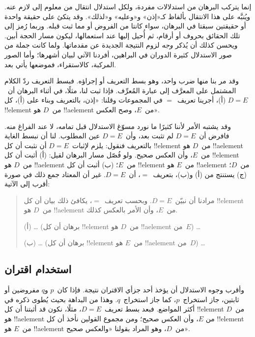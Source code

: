 \documentclass[../../../include/open-logic-section]{subfiles}
\begin{document}


إنما يتركب البرهان من استدلالات مفردة، ولكل استدلال انتقال من معلوم
إلى لازم عنه. ويُنبَّه على هذا الانتقال بألفاظ كـ«إذن» و«وعليه»
و«لذلك». وقد يتكئ على حقيقة واحدة أو حقيقتين سبقتا في البرهان، سواء
كانتا من الفروض أو مما ثبت قبله. وربما رُمز إلى تلك الحقائق بحروف أو
أرقام، ثم أُحيل إليها عند استعمالها، ليكون مسار الحجة أبين. ويحسن
كذلك أن يُذكر \emph{وجه} لزوم النتيجة الجديدة عن مقدماتها. ولما كانت
جملة من صور الاستدلال كثيرة الدوران في البراهين، أفردنا الآتي لبيان
أشهرها؛ وأما الصور المركبة، كالاستقراء، فموضعها يأتي بعد.

وقد مر بنا منها ضرب واحد، وهو بسط التعريف أو إجراؤه. فبسط التعريف ردّ
الكلام المشتمل على المعرَّف إلى عبارة المُعرِّف. فإذا ثبت لنا، مثلًا،
في أثناء البرهان أن~$D = E$ (أ)، أجرينا تعريف~$=$ في المجموعات وقلنا:
«إذن، بالتعريف وبناء على (أ)، كل !!{element} من~$D$ هو !!a{element}
من~$E$، وصح العكس».

وقد يشتبه الأمر لأننا كثيرًا ما نورد مسوّغ الاستدلال قبل تمامه، لا
عند الفراغ منه. فافرض أن~$D = E$ لم تثبت بعد، وأن~$D = E$ عين
المطلوب. لنا أن نبسط الغاية بالتعريف فنقول: يلزم لإثبات~$D = E$ أن نثبت أن كل
!!{element} من~$D$ هو !!a{element} من~$E$، وأن العكس صحيح. ولو فُصّل
مسار البرهان لقيل: (أ) أثبت أن كل !!{element} من~$D$ هو !!a{element}
من~$E$؛ (ب) أثبت أن كل !!{element} من~$E$ هو !!a{element} من~$D$؛
(ج) يستنتج من (أ) و(ب)، بتعريف~$=$، أن~$D = E$. غير أن المعتاد جمع
ذلك في صورة أقرب إلى الآتية:
\begin{quote}
مرادنا أن نبيّن~$D = E$. وبحسب تعريف~$=$، يكافئ ذلك بيان أن كل
!!{element} من~$D$ هو !!a{element} من~$E$، وأن الأمر بالعكس كذلك.

(أ) \dots{} (برهان أن كل !!{element} من~$D$ هو !!a{element} من~$E$)
\dots

(ب) \dots{} (برهان أن كل !!{element} من~$E$ هو !!a{element} من~$D$)
\dots
\end{quote}

\subsection{استخدام اقتران}

وأقرب وجوه الاستدلال أن يؤخذ أحد جزأي الاقتران نتيجة. فإذا كان~$p$
و$q$ مفروضين أو ثابتين، جاز استخراج~$p$، كما جاز استخراج~$q$. وهذا
من البداهة بحيث يُطوى ذكره في أكثر المواضع. فبعد بسط تعريف~$D = E$،
مثلًا، نكون قد أثبتنا أن كل !!{element} من~$D$ هو !!a{element} من
$E$، وأن العكس صحيح؛ ومن مجموع القولين نأخذ أن كل !!{element} من~$E$
هو !!a{element} من~$D$، وهو المراد بقولنا «والعكس صحيح».
\end{document}
